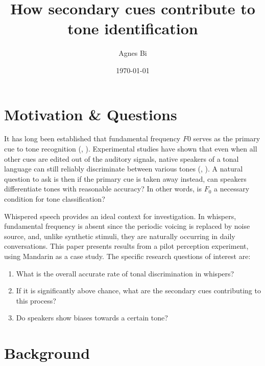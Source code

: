\documentclass[12pt,letterpaper]{scrartcl}
\title{How secondary cues contribute to tone identification}
\author{Agnes Bi}
\date{\today}
\begin{document}
\maketitle

%

\section{Motivation \& Questions}

It has long been established that fundamental frequency $F0$ serves as the primary cue to tone recognition (\cite{gandour1978PerceptionTone}, \cite{yip2002Tone}). Experimental studies have shown that even when all other cues are edited out of the auditory signals, native speakers of a tonal language can still reliably discriminate between various tones (\cite{fok1974perceptualstudytones}, \cite{abramson1978Staticdynamicacoustic}). A natural question to ask is then if the primary cue is taken away instead, can speakers differentiate tones with reasonable accuracy? In other words, is $F_0$ a necessary condition for tone classification? 

Whispered speech provides an ideal context for investigation. In whispers, fundamental frequency is absent since the periodic voicing is replaced by noise source, and, unlike synthetic stimuli, they are naturally occurring in daily conversations. This paper presents results from a pilot perception experiment, using Mandarin as a case study. The specific research questions of interest are:

	\begin{enumerate}[noitemsep]
		\item What is the overall accurate rate of tonal discrimination in whispers? 

		\item If it is significantly above chance, what are the secondary cues contributing to this process? 

		\item Do speakers show biases towards a certain tone?

	\end{enumerate}


\section{Background}
\end{document}
